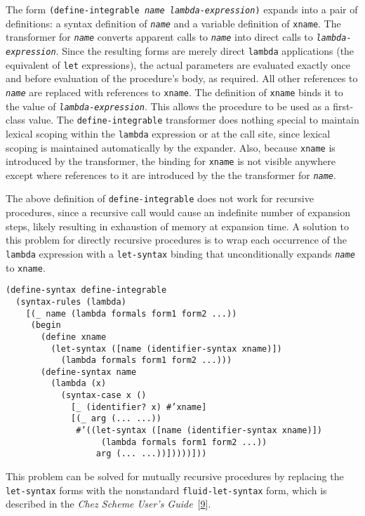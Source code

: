 The form \texttt{(define-integrable \textit{name} \textit{lambda-expression})}
expands into a pair of definitions:  a syntax definition of \texttt{\textit{name}} and
a variable definition of \texttt{xname}.
The transformer for \texttt{\textit{name}} converts apparent calls to
\texttt{\textit{name}} into direct calls to \texttt{\textit{lambda-expression}}.
Since the resulting forms are merely direct \texttt{lambda} applications
(the equivalent of \texttt{let} expressions),
the actual parameters are evaluated exactly once and before evaluation
of the procedure's body, as required.
All other references to \texttt{\textit{name}} are replaced with references to
\texttt{xname}.
The definition of \texttt{xname} binds it to the value of
\texttt{\textit{lambda-expression}}.
This allows the procedure to be used as a first-class value.
The \texttt{define-integrable} transformer does nothing special to
maintain lexical scoping within the \texttt{lambda} expression or at the
call site, since lexical scoping is maintained automatically by the
expander.
Also, because \texttt{xname} is introduced by the transformer, the binding
for \texttt{xname} is not visible anywhere except where references to it
are introduced by the the transformer for \texttt{\textit{name}}.


The above definition of \texttt{define-integrable} does not work for
recursive procedures, since a recursive call would cause an indefinite
number of expansion steps, likely resulting in exhaustion
of memory at expansion time.
A solution to this problem for directly recursive procedures is to wrap
each occurrence of the \texttt{lambda} expression with a \texttt{let-syntax}
binding that unconditionally expands \texttt{\textit{name}} to \texttt{xname}.


\begin{alltt}
(define-syntax define-integrable
  (syntax-rules (lambda)
    [(\_{} name (lambda formals form1 form2 ...))
     (begin
       (define xname
         (let-syntax ([name (identifier-syntax xname)])
           (lambda formals form1 form2 ...)))
       (define-syntax name
         (lambda (x)
           (syntax-case x ()
             [\_{} (identifier? x) \#{}'xname]
             [(\_{} arg (... ...))
              \#{}'((let-syntax ([name (identifier-syntax xname)])
                   (lambda formals form1 form2 ...))
                  arg (... ...))]))))]))
\end{alltt}


This problem can be solved for mutually recursive procedures by
replacing the \texttt{let-syntax} forms with the nonstandard
\texttt{fluid-let-syntax} form, which is described in the \textit{Chez Scheme
User's Guide} [\hyperref[bibliography_g227]{9}].



